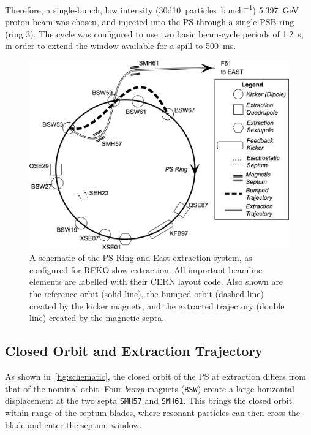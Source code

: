 \documentclass[a4paper,twoside,11pt]{report}
\begin{document}
Therefore, a single-bunch, low intensity (\qty[per-mode=symbol]{30d10}{particles\per bunch}) \qty{5.397}{\giga\electronvolt} proton beam was chosen, and injected into the PS through a single PSB ring (ring 3). The cycle was configured to use two basic beam-cycle periods of \qty{1.2}{\second}, in order to extend the window available for a spill to \qty{500}{\milli\second}.

\begin{figure}
  \centering
  \includegraphics*[width=\linewidth]{ps-sx-system.png}
  \caption[Schematic of the PS Ring and East extraction system configured for RFKO slow extraction]{A schematic of the PS Ring and East extraction system, as configured for RFKO slow extraction. All important beamline elements are labelled with their CERN layout code. Also shown are the reference orbit (solid line), the bumped orbit (dashed line) created by the kicker magnets, and the extracted trajectory (double line) created by the magnetic septa.}\label{fig:schematic}
\end{figure}

\subsection{Closed Orbit and Extraction Trajectory}

As shown in~\autoref{fig:schematic}, the closed orbit of the PS at extraction differs from that of the nominal orbit. Four \textit{bump} magnets (\verb|BSW|) create a large horizontal displacement at the two septa \verb|SMH57| and \verb|SMH61|. This brings the closed orbit within range of the septum blades, where resonant particles can then cross the blade and enter the septum window.
\end{document}
